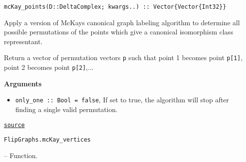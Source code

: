 \begin{adjustwidth}{2em}{0pt}


\begin{verbatim}
mcKay_points(D::DeltaComplex; kwargs..) :: Vector{Vector{Int32}}
\end{verbatim}

Apply a version of McKay{\textquotesingle}s canonical graph labeling algorithm to determine all possible permutations  of the points which give a canonical isomorphism class representant.

Return a vector of permutation vectors \texttt{p} such that point 1 becomes point \texttt{p[1]}, point 2 becomes point \texttt{p[2]},...

\textbf{Arguments}

\begin{itemize}
\item \texttt{only\_one :: Bool = false}, If set to true, the algorithm will stop after finding a single valid permutation.

\end{itemize}


\href{https://github.com/schto223/FlipGraphs.jl/blob/e35d43698a06b86273148826b79d585ba04fcd26/src/flipGraph.jl#L734-L744}{\texttt{source}}


\end{adjustwidth}
\hypertarget{15594744299233707772}{\texttt{FlipGraphs.mcKay\_vertices}}  -- {Function.}

